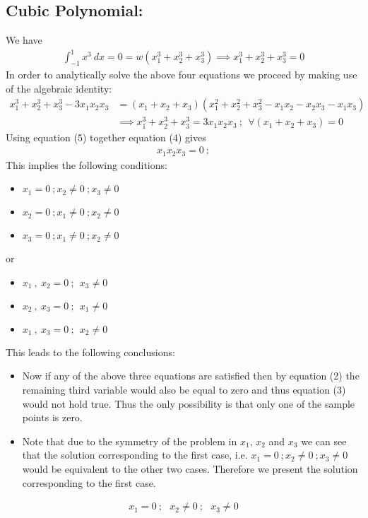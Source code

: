 \subsection*{Cubic Polynomial: }
We have
\begin{align}
\int_{-1}^1 x^3\ dx = 0 = w \left( x^3_1 + x^3_2 + x^3_3 \right) \implies  x^3_1 + x^3_2 + x^3_3 = 0
\end{align}
In order to analytically solve the above four equations we proceed by making use of the algebraic identity:  
\begin{align}
\nonumber x^3_1 + x^3_2 + x^3_3 - 3x_1x_2x_3  & = (x_1+x_2+x_3)(x^2_1+x^2_2+x^2_3 - x_1x_2 - x_2x_3 - x_1x_3)\\
& \implies  x^3_1 + x^3_2 + x^3_3 = 3x_1x_2x_3\ ;\ \ \forall (x_1+x_2+x_3) = 0
\end{align}
Using equation (5) together equation (4) gives
\begin{align}
x_1x_2x_3 = 0\ ;
\end{align}
\newpage This implies the following conditions:
\begin{itemize}
\item $x_1 = 0\ ;x_2 \neq 0\ ; x_3 \neq 0 $
\item $x_2 = 0\ ;x_1 \neq 0\ ; x_2 \neq 0 $
\item $x_3 = 0\ ;x_1 \neq 0\ ; x_2 \neq 0 $
\end{itemize}
or 
\begin{itemize}
\item $x_1\ , \ x_2 = 0\ ; \ \ x_3 \neq 0 $
\item $x_2\ , \ x_3 = 0\ ; \ \ x_1 \neq 0 $
\item $x_1\ , \ x_3 = 0\ ; \ \ x_2 \neq 0 $
\end{itemize} 
This leads to the following conclusions: 
\begin{itemize}
\item Now if any of the above three equations are satisfied then by equation (2) the remaining third variable would also be equal to zero and thus equation (3) would not hold true. Thus the only possibility is that only one of the sample points is zero. 
\item Note that due to the symmetry of the problem in $x_1$, $x_2$ and $x_3$ we can see that the solution corresponding to the first case, i.e.  $x_1 = 0\ ;x_2 \neq 0\ ; x_3 \neq 0 $ would be equivalent to the other two cases. Therefore we present the solution corresponding to the first case. 
\end{itemize}
\begin{align*}
x_1 = 0\ ; \ \ \ x_2 \neq 0\ ; \ \ \ x_3 \neq 0  
\end{align*}

